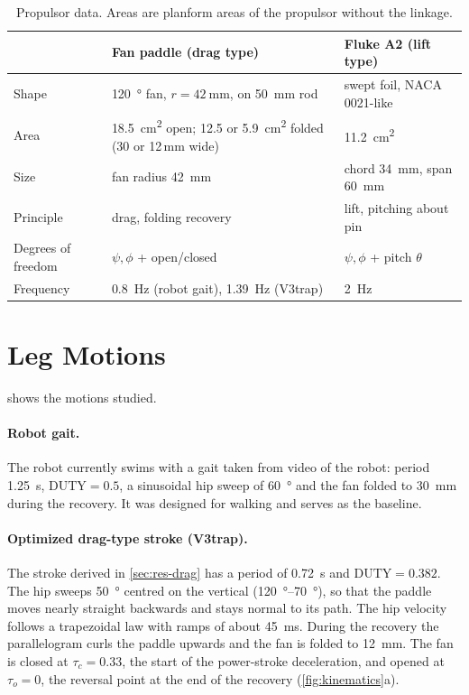 \begin{table}[t]
  \centering
  \caption[Propulsor data]{Propulsor data. Areas are planform areas of the propulsor without the linkage.}
  \label{tab:propulsors}
  \small
  \begin{tabularx}{\textwidth}{@{}l>{\raggedright\arraybackslash}X>{\raggedright\arraybackslash}X@{}}
    \toprule
    & Fan paddle (drag type) & Fluke A2 (lift type) \\
    \midrule
    Shape & \SI{120}{\degree} fan, $r=\SI{42}{\milli\metre}$, on \SI{50}{\milli\metre} rod & swept foil, NACA\,0021-like \\
    Area & \SI{18.5}{\square\centi\metre} open; \SI{12.5}{} or \SI{5.9}{\square\centi\metre} folded (30 or 12\,mm wide) & \SI{11.2}{\square\centi\metre} \\
    Size & fan radius \SI{42}{\milli\metre} & chord \SI{34}{\milli\metre}, span \SI{60}{\milli\metre} \\
    Principle & drag, folding recovery & lift, pitching about pin \\
    Degrees of freedom & $\psi,\phi$ + open/closed & $\psi,\phi$ + pitch $\theta$ \\
    Frequency & \SI{0.8}{\hertz} (robot gait), \SI{1.39}{\hertz} (V3trap) & \SI{2}{\hertz} \\
    \bottomrule
  \end{tabularx}
\end{table}

\section{Leg Motions}
\label{sec:plat-motions}

 shows the motions studied.

\paragraph{Robot gait.} The robot currently swims with a gait taken from video of the robot: period
\SI{1.25}{\second}, $\mathrm{DUTY}=0.5$, a sinusoidal hip sweep of \SI{60}{\degree} and the fan folded to
\SI{30}{\milli\metre} during the recovery. It was designed for walking and serves as the baseline.

\paragraph{Optimized drag-type stroke (V3trap).} The stroke derived in \cref{sec:res-drag} has a period of
\SI{0.72}{\second} and $\mathrm{DUTY}=0.382$. The hip sweeps \SI{50}{\degree} centred on the vertical
(\SIrange{120}{70}{\degree}), so that the paddle moves nearly straight backwards and stays normal to its path.
The hip velocity follows a trapezoidal law with ramps of about \SI{45}{\milli\second}. During the recovery the
parallelogram curls the paddle upwards and the fan is folded to \SI{12}{\milli\metre}. The fan is closed at
$\tau_c=0.33$, the start of the power-stroke deceleration, and opened at $\tau_o=0$, the reversal point at the
end of the recovery (\cref{fig:kinematics}a).

